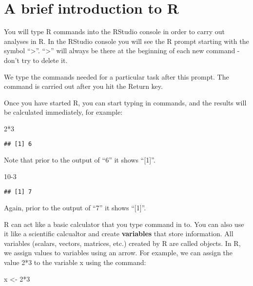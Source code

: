 \documentclass[
]{book}
\newenvironment{Shaded}{\begin{snugshade}}{\end{snugshade}}
\newcommand{\DecValTok}[1]{\textcolor[rgb]{0.00,0.00,0.81}{#1}}
\newcommand{\NormalTok}[1]{#1}
\newcommand{\OtherTok}[1]{\textcolor[rgb]{0.56,0.35,0.01}{#1}}
\newcommand{\SpecialCharTok}[1]{\textcolor[rgb]{0.00,0.00,0.00}{#1}}
\begin{document}
\hypertarget{a-brief-introduction-to-r-1}{%
\section{A brief introduction to R}\label{a-brief-introduction-to-r-1}}

You will type R commands into the RStudio console in order to carry out analyses in R. In the RStudio console you will see the R prompt starting with the symbol ``\textgreater{}''. ``\textgreater{}'' will always be there at the beginning of each new command - don't try to delete it.

We type the commands needed for a particular task after this prompt. The command is carried out after you hit the Return key.

Once you have started R, you can start typing in commands, and the results will be calculated immediately, for example:

\begin{Shaded}
\begin{Highlighting}[]
\DecValTok{2}\SpecialCharTok{*}\DecValTok{3}
\end{Highlighting}
\end{Shaded}

\begin{verbatim}
## [1] 6
\end{verbatim}

Note that prior to the output of ``6'' it shows ``{[}1{]}''.

\begin{Shaded}
\begin{Highlighting}[]
\DecValTok{10{-}3}
\end{Highlighting}
\end{Shaded}

\begin{verbatim}
## [1] 7
\end{verbatim}

Again, prior to the output of ``7'' it shows ``{[}1{]}''.

R can act like a basic calculator that you type command in to. You can also use it like a scientific calcualtor and create \textbf{variables} that store information. All variables (scalars, vectors, matrices, etc.) created by R are called objects. In R, we assign values to variables using an arrow. For example, we can assign the value 2*3 to the variable x using the command:

\begin{Shaded}
\begin{Highlighting}[]
\NormalTok{x }\OtherTok{\textless{}{-}} \DecValTok{2}\SpecialCharTok{*}\DecValTok{3}
\end{Highlighting}
\end{Shaded}
\end{document}
